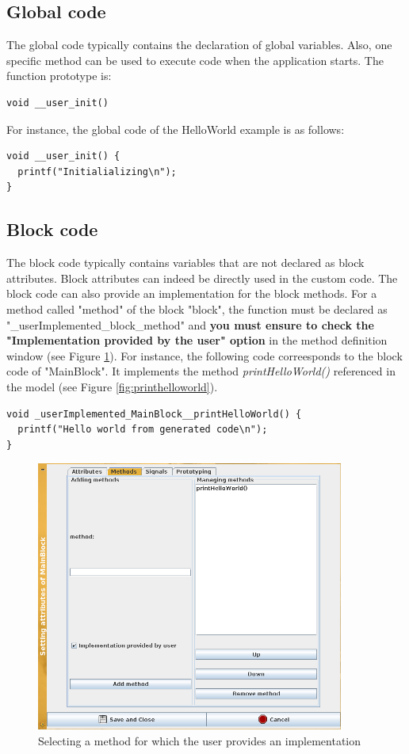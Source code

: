 \documentclass[12pt]{article}
\begin{document}
\subsection{Global code}
The global code typically contains the declaration of global variables. Also, one specific method can be used to execute code when the application starts. The function prototype is: 
\begin{verbatim}
void __user_init()
\end{verbatim}
For instance, the global code of the HelloWorld example is as follows:
\begin{lstlisting}
void __user_init() {
  printf("Initialializing\n");
}
\end{lstlisting}

\subsection{Block code}
The block code typically contains variables that are not declared as block attributes. Block attributes can indeed be directly used in the custom code. The block code can also provide an implementation for the block methods. For a method called "method" of the block "block", the function must be declared as "\_userImplemented\_block\_method" and \textbf{you must ensure to check the "Implementation provided by the user" option} in the method definition window (see Figure \ref{fig:methodhelloworld}). For instance, the following code correesponds to the block code of "MainBlock". It implements the method \textit{printHelloWorld()} referenced in the model (see Figure \ref{fig:printhelloworld}).
\begin{lstlisting}
void _userImplemented_MainBlock__printHelloWorld() {
  printf("Hello world from generated code\n");
}
\end{lstlisting}

\begin{figure}[htbp]
\centering
\includegraphics[width=0.9\textwidth]{figures/methodhelloworld}
\caption{Selecting a method for which the user provides an implementation}\label{fig:methodhelloworld}
\end{figure}
\end{document}
